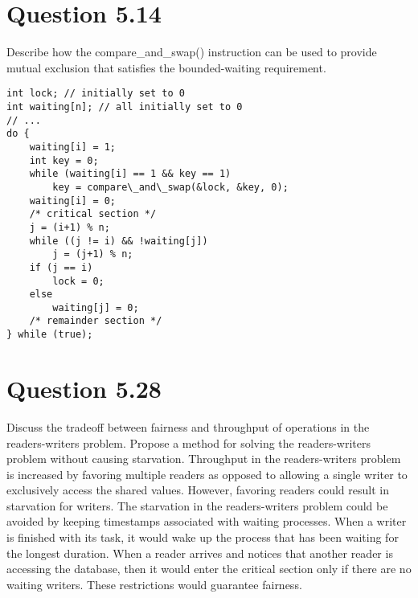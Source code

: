 \documentclass[12pt]{article}
\begin{document}
\section*{Question 5.14} {\color{blue}Describe how the compare\_and\_swap() instruction can be used to provide mutual exclusion that satisfies the bounded-waiting requirement.}

\begin{lstlisting}
int lock; // initially set to 0
int waiting[n]; // all initially set to 0
// ...
do {
	waiting[i] = 1;
	int key = 0;
	while (waiting[i] == 1 && key == 1)
		key = compare\_and\_swap(&lock, &key, 0);
	waiting[i] = 0;
	/* critical section */
	j = (i+1) % n;
	while ((j != i) && !waiting[j])
		j = (j+1) % n;
	if (j == i)
		lock = 0;
	else
		waiting[j] = 0;
	/* remainder section */
} while (true);
\end{lstlisting}

\section*{Question 5.28} {\color{blue}Discuss the tradeoff between fairness and throughput of operations in the readers-writers problem. Propose a method for solving the readers-writers problem without causing starvation.} 
Throughput in the readers-writers problem is increased by favoring multiple readers as opposed to allowing a single writer to exclusively access the shared values. However, favoring readers could result in starvation for writers. The starvation in the readers-writers problem could be avoided by keeping timestamps associated with waiting processes. When a writer is finished with its task, it would wake up the process that has been waiting for the longest duration. When a reader arrives and notices that another reader is accessing the database, then it would enter the critical section only if there are no waiting writers. These restrictions would guarantee fairness.
\end{document}
